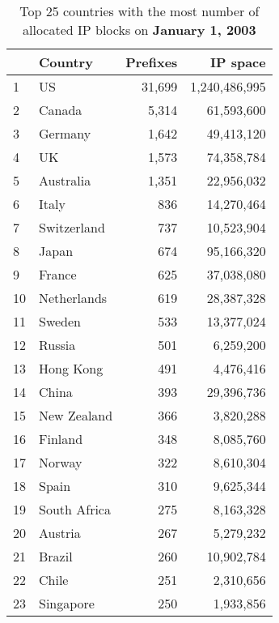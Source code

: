 \begin{table*}[tp]
\begin{minipage}[t]{0.48\textwidth}
	\begin{center}
	\caption{Top 25 countries with the most number of allocated IP blocks on \textbf{January 1, 2003}}
	\label{tab:top25 rir prefixes 2003}
	\begin{tabular}{|l||l|r|r|}
		\hline
		&      \bf Country		& \bf Prefixes  &  \bf  IP space 		\tabularnewline \hline
1       &       US      		&       31,699  &       1,240,486,995   \tabularnewline
2       &       Canada  		&       5,314   &       61,593,600      \tabularnewline
3       &       Germany 		&       1,642   &       49,413,120      \tabularnewline
4       &       UK      		&       1,573   &       74,358,784      \tabularnewline
5       &       Australia       &       1,351   &       22,956,032      \tabularnewline
6       &       Italy   		&       836     &       14,270,464      \tabularnewline
7       &       Switzerland     &       737     &       10,523,904      \tabularnewline
8       &       Japan   		&       674     &       95,166,320      \tabularnewline
9       &       France  		&       625     &       37,038,080      \tabularnewline
10      &       Netherlands     &       619     &       28,387,328      \tabularnewline
11      &       Sweden  		&       533     &       13,377,024      \tabularnewline
12      &       Russia  		&       501     &       6,259,200       \tabularnewline
13      &       Hong Kong       &       491     &       4,476,416       \tabularnewline
14      &       China   		&       393     &       29,396,736      \tabularnewline
15      &       New Zealand     &       366     &       3,820,288       \tabularnewline
16      &       Finland 		&       348     &       8,085,760       \tabularnewline
17      &       Norway  		&       322     &       8,610,304       \tabularnewline
18      &       Spain   		&       310     &       9,625,344       \tabularnewline
19      &       South Africa    &       275     &       8,163,328       \tabularnewline
20      &       Austria 		&       267     &       5,279,232       \tabularnewline
21      &       Brazil  		&       260     &       10,902,784      \tabularnewline
22      &       Chile   		&       251     &       2,310,656       \tabularnewline
23      &       Singapore       &       250     &       1,933,856       \tabularnewline

\end{tabular}
\end{center}
\end{minipage}
\end{table*}
